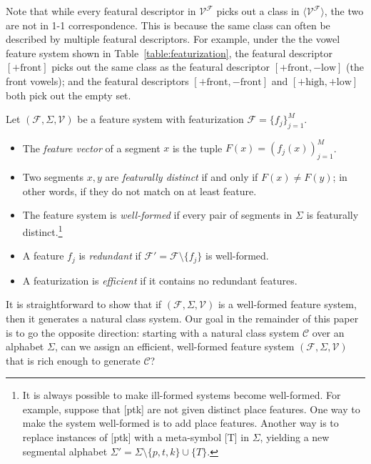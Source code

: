 \documentclass[11pt, oneside]{article}   	%
\begin{document}
Note that while every featural descriptor in $\mathcal V^\mathcal F$ picks out a class in $\langle \mathcal V^\mathcal F \rangle$, the two are not in 1-1 correspondence. This is because the same class can often be described by multiple featural descriptors. For example, under the the vowel feature system shown in Table~\ref{table:featurization}, the featural descriptor $[+\text{front}]$ picks out the same class as the featural descriptor $[+ \text{front}, - \text{low}]$ (the front vowels); and the featural descriptors $[+\text{front}, -\text{front}]$ and $[+\text{high}, +\text{low}]$ both pick out the empty set.

\vspace{\baselineskip} \noindent Let $(\mathcal F, \Sigma, \mathcal V)$ be a feature system with featurization $\mathcal F = \{f_j\}_{j=1}^M$. \begin{itemize}
    \item The \textit{feature vector} of a segment $x$ is the tuple $F(x) = (f_j(x))_{j=1}^M$.
    \item Two segments $x, y$ are \textit{featurally distinct} if and only if $F(x) \neq F(y)$; in other words, if they do not match on at least feature.
    \item The feature system is \textit{well-formed} if every pair of segments in $\Sigma$ is featurally distinct.\footnote{It is always possible to make ill-formed systems become well-formed. For example, suppose that [ptk] are not given distinct place features. One way to make the system well-formed is to add place features. Another way is to replace instances of [ptk] with a meta-symbol [T] in $\Sigma$, yielding a new segmental alphabet $\Sigma ' = \Sigma \setminus \{p,t,k\} \cup \{T\}$.}
    \item A feature $f_j$ is \textit{redundant} if $\mathcal F' = \mathcal F \setminus \{ f_j \}$ is well-formed.
    \item A featurization is \textit{efficient} if it contains no redundant features.
    \end{itemize}

It is straightforward to show that if $(\mathcal F, \Sigma, \mathcal V)$ is a well-formed feature system, then it generates a natural class system.  Our goal in the remainder of this paper is to go the opposite direction: starting with a natural class system $\mathcal C$ over an alphabet $\Sigma$, can we assign an efficient, well-formed feature system $(\mathcal F, \Sigma, \mathcal V)$ that is rich enough to generate $\mathcal C$?
\end{document}
